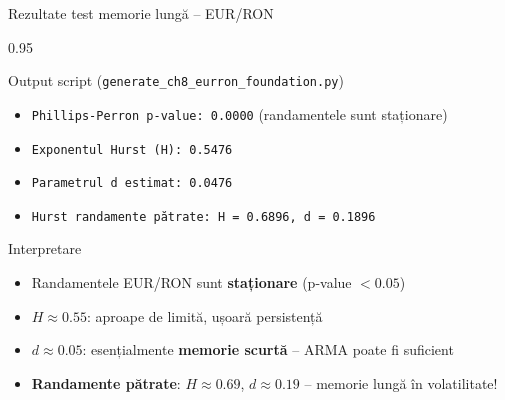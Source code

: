 \documentclass[9pt, aspectratio=169, t]{beamer}
\begin{document}
\begin{frame}{Rezultate test memorie lungă -- EUR/RON}
    \begin{cminipage}{0.95\textwidth}
        \begin{block}{Output script (\texttt{generate\_ch8\_eurron\_foundation.py})}
            {\footnotesize
            \begin{itemize}\setlength{\itemsep}{0pt}
                \item \texttt{Phillips-Perron p-value: 0.0000} (randamentele sunt staționare)
                \item \texttt{Exponentul Hurst (H): 0.5476}
                \item \texttt{Parametrul d estimat: 0.0476}
                \item \texttt{Hurst randamente pătrate: H = 0.6896, d = 0.1896}
            \end{itemize}
            }
        \end{block}

        \vspace{0.2cm}

        \begin{alertblock}{Interpretare}
            \begin{itemize}\setlength{\itemsep}{0pt}
                \item Randamentele EUR/RON sunt \textbf{staționare} (p-value $< 0.05$)
                \item $H \approx 0.55$: aproape de limită, ușoară persistență
                \item $d \approx 0.05$: esențialmente \textbf{memorie scurtă} -- ARMA poate fi suficient
                \item \textbf{Randamente pătrate}: $H \approx 0.69$, $d \approx 0.19$ -- memorie lungă în volatilitate!
            \end{itemize}
        \end{alertblock}
    \end{cminipage}
\end{frame}
\end{document}
